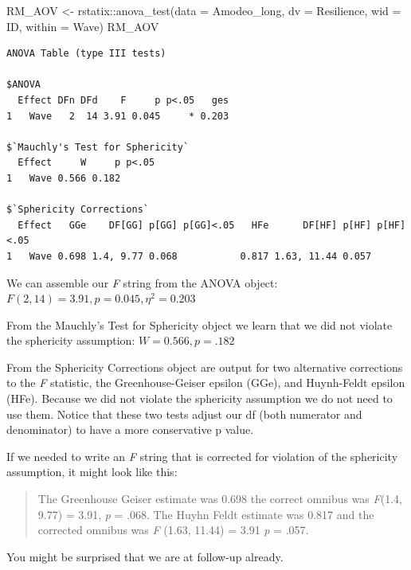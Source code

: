 \documentclass[
  11pt,
]{book}
\newenvironment{Shaded}{\begin{snugshade}}{\end{snugshade}}
\newcommand{\AttributeTok}[1]{\textcolor[rgb]{0.77,0.63,0.00}{#1}}
\newcommand{\FunctionTok}[1]{\textcolor[rgb]{0.00,0.00,0.00}{#1}}
\newcommand{\NormalTok}[1]{#1}
\newcommand{\OtherTok}[1]{\textcolor[rgb]{0.56,0.35,0.01}{#1}}
\newcommand{\SpecialCharTok}[1]{\textcolor[rgb]{0.00,0.00,0.00}{#1}}
\begin{document}
\begin{Shaded}
\begin{Highlighting}[]
\NormalTok{RM\_AOV }\OtherTok{\textless{}{-}}\NormalTok{ rstatix}\SpecialCharTok{::}\FunctionTok{anova\_test}\NormalTok{(}\AttributeTok{data =}\NormalTok{ Amodeo\_long, }\AttributeTok{dv =}\NormalTok{ Resilience, }\AttributeTok{wid =}\NormalTok{ ID,}
    \AttributeTok{within =}\NormalTok{ Wave)}
\NormalTok{RM\_AOV}
\end{Highlighting}
\end{Shaded}

\begin{verbatim}
ANOVA Table (type III tests)

$ANOVA
  Effect DFn DFd    F     p p<.05   ges
1   Wave   2  14 3.91 0.045     * 0.203

$`Mauchly's Test for Sphericity`
  Effect     W     p p<.05
1   Wave 0.566 0.182      

$`Sphericity Corrections`
  Effect   GGe    DF[GG] p[GG] p[GG]<.05   HFe      DF[HF] p[HF] p[HF]<.05
1   Wave 0.698 1.4, 9.77 0.068           0.817 1.63, 11.44 0.057          
\end{verbatim}

We can assemble our \emph{F} string from the ANOVA object: \(F(2,14) = 3.91, p = 0.045, \eta^2 = 0.203\)

From the Mauchly's Test for Sphericity object we learn that we did not violate the sphericity assumption: \(W = 0.566, p = .182\)

From the Sphericity Corrections object are output for two alternative corrections to the \emph{F} statistic, the Greenhouse-Geiser epsilon (GGe), and Huynh-Feldt epsilon (HFe). Because we did not violate the sphericity assumption we do not need to use them. Notice that these two tests adjust our df (both numerator and denominator) to have a more conservative p value.

If we needed to write an \emph{F} string that is corrected for violation of the sphericity assumption, it might look like this:

\begin{quote}
The Greenhouse Geiser estimate was 0.698 the correct omnibus was \emph{F}(1.4, 9.77) = 3.91, \emph{p} = .068.
The Huyhn Feldt estimate was 0.817 and the corrected omnibus was \emph{F} (1.63, 11.44) = 3.91 \emph{p} = .057.
\end{quote}

You might be surprised that we are at follow-up already.
\end{document}
